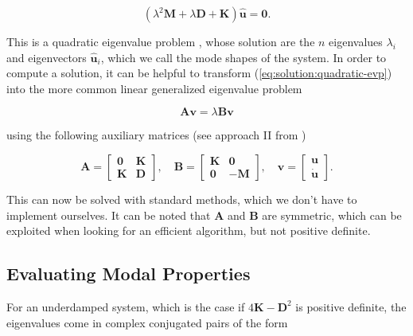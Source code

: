 \begin{equation}
\left(\lambda^2 \boldsymbol{M} + \lambda \boldsymbol{D} + \boldsymbol{K}\right)\hat{\boldsymbol{u}} = \boldsymbol{0}. \label{eq:solution:quadratic-evp}
\end{equation}

This is a quadratic eigenvalue problem \cite{bib:dw07}, whose solution are the $n$ eigenvalues $\lambda_{i}$ and eigenvectors $\hat{\boldsymbol{u}}_{i}$, which we call the mode shapes of the system.
In order to compute a solution, it can be helpful to transform (\ref{eq:solution:quadratic-evp}) into the more common linear generalized eigenvalue problem

\begin{equation}
\boldsymbol{A}\boldsymbol{v} = \lambda\boldsymbol{B}\boldsymbol{v}
\end{equation}

using the following auxiliary matrices (see approach II from \cite{bib:dw07})

\begin{equation}
\boldsymbol{A}
=
\begin{bmatrix}
\boldsymbol{0} & \boldsymbol{K} \\
\boldsymbol{K} & \boldsymbol{D}
\end{bmatrix},
\quad
\boldsymbol{B}
=
\begin{bmatrix}
\boldsymbol{K} & \boldsymbol{0} \\
\boldsymbol{0} & \boldsymbol{-M}
\end{bmatrix},
\quad
\boldsymbol{v}
=
\begin{bmatrix}
\boldsymbol{u} \\
\dot{\boldsymbol{u}}
\end{bmatrix}.
\end{equation}

This can now be solved with standard methods, which we don't have to implement ourselves.
It can be noted that $\boldsymbol{A}$ and $\boldsymbol{B}$ are symmetric, which can be exploited when looking for an efficient algorithm, but not positive definite.

\subsection{Evaluating Modal Properties}

For an underdamped system, which is the case if $4\boldsymbol{K} - \boldsymbol{D}^2$ is positive definite, the eigenvalues come in complex conjugated pairs of the form \cite{bib:li95}

